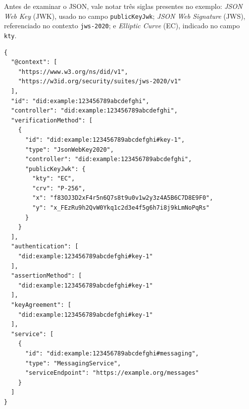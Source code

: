 Antes de examinar o JSON, vale notar três siglas presentes no exemplo: \textit{JSON Web Key} (JWK), usado no campo \texttt{publicKeyJwk}; \textit{JSON Web Signature} (JWS), referenciado no contexto \texttt{jws-2020}; e \textit{Elliptic Curve} (EC), indicado no campo \texttt{kty}.

\begin{verbatim}
{
  "@context": [
    "https://www.w3.org/ns/did/v1",
    "https://w3id.org/security/suites/jws-2020/v1"
  ],
  "id": "did:example:123456789abcdefghi",
  "controller": "did:example:123456789abcdefghi",
  "verificationMethod": [
    {
      "id": "did:example:123456789abcdefghi#key-1",
      "type": "JsonWebKey2020",
      "controller": "did:example:123456789abcdefghi",
      "publicKeyJwk": {
        "kty": "EC",
        "crv": "P-256",
        "x": "f83OJ3D2xF4r5n6Q7s8t9u0v1w2y3z4A5B6C7D8E9F0",
        "y": "x_FEzRu9h2QvW0Ykq1c2d3e4f5g6h7i8j9kLmNoPqRs"
      }
    }
  ],
  "authentication": [
    "did:example:123456789abcdefghi#key-1"
  ],
  "assertionMethod": [
    "did:example:123456789abcdefghi#key-1"
  ],
  "keyAgreement": [
    "did:example:123456789abcdefghi#key-1"
  ],
  "service": [
    {
      "id": "did:example:123456789abcdefghi#messaging",
      "type": "MessagingService",
      "serviceEndpoint": "https://example.org/messages"
    }
  ]
}
\end{verbatim}

